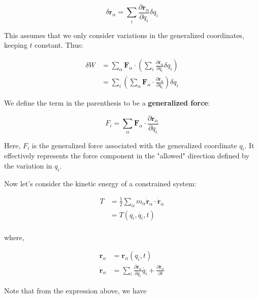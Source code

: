 \begin{equation}
    \delta \mathbf{r}_\alpha = \sum_{i} \frac{\partial \mathbf{r}_\alpha}{\partial q_i} \delta q_i
\end{equation}

This assumes that we only consider variations in the generalized coordinates, keeping
$t$ constant. Thus:

\begin{align}
    \delta W & = \sum_{\alpha} \mathbf{F}_\alpha \cdot \left(\sum_{i} \frac{\partial \mathbf{r}_\alpha}{\partial q_i} \delta q_i \right)    \\
             & = \sum_{i} \left(\sum_{\alpha} \mathbf{F}_{\alpha} \cdot \frac{ \partial \mathbf{r}_\alpha}{\partial q_i} \right) \delta q_i
\end{align}

We define the term in the parenthesis to be a \textbf{generalized force}:

\begin{equation}
    F_i = \sum_{\alpha} \mathbf{F}_{\alpha} \cdot \frac{\partial \mathbf{r}_\alpha}{\partial q_i}
\end{equation}

Here, $F_i$ is the generalized force associated with the generalized coordinate $q_i$. It effectively represents the force component in the "allowed" direction defined by the variation in $q_i$.

Now let's consider the kinetic energy of a constrained system:

\begin{align}
    T & = \frac{1}{2} \sum_{\alpha} m_\alpha \dot{\mathbf{r}}_\alpha \cdot \dot{\mathbf{r}}_\alpha \\
      & = T(q_i, \dot{q_i}, t)                                                                     \\
\end{align}

where,

\begin{align}
    \mathbf{r}_\alpha       & = \mathbf{r}_\alpha(q_i, t)                                                                                        \\
    \dot{\mathbf{r}}_\alpha & = \sum_i \frac{\partial \mathbf{r}_\alpha}{\partial q_i} \dot{q_i} + \frac{\partial \mathbf{r}_\alpha}{\partial t}
\end{align}

Note that from the expression above, we have

